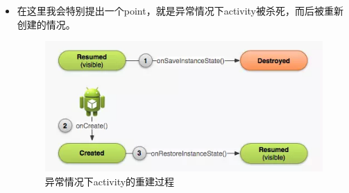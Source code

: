 \documentclass[9pt, b5paaper]{book}
\begin{document}
\begin{itemize}
\item 在这里我会特别提出一个point，就是异常情况下activity被杀死，而后被重新创建的情况。

\begin{figure}[htb]
\centering
\includegraphics[width=.9\linewidth]{./pic/recreateActivity.png}
\caption{异常情况下activity的重建过程}
\end{figure}


\end{itemize}
\end{document}
